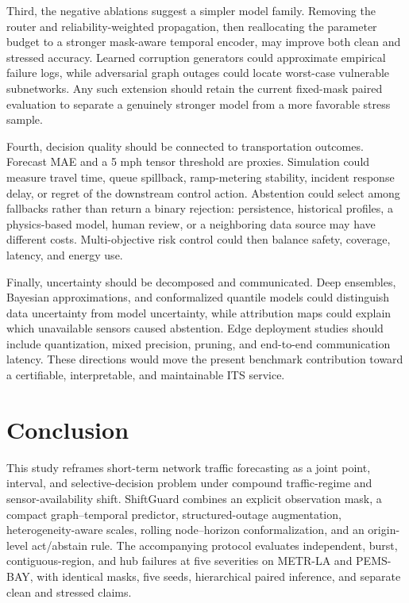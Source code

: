 \documentclass[pdflatex,sn-mathphys-num]{sn-jnl}
\begin{document}
Third, the negative ablations suggest a simpler model family. Removing the
router and reliability-weighted propagation, then reallocating the parameter
budget to a stronger mask-aware temporal encoder, may improve both clean and
stressed accuracy. Learned corruption generators could approximate empirical
failure logs, while adversarial graph outages could locate worst-case vulnerable
subnetworks. Any such extension should retain the current fixed-mask paired
evaluation to separate a genuinely stronger model from a more favorable stress
sample.

Fourth, decision quality should be connected to transportation outcomes.
Forecast MAE and a 5 mph tensor threshold are proxies. Simulation could measure
travel time, queue spillback, ramp-metering stability, incident response delay,
or regret of the downstream control action. Abstention could select among
fallbacks rather than return a binary rejection: persistence, historical
profiles, a physics-based model, human review, or a neighboring data source may
have different costs. Multi-objective risk control could then balance safety,
coverage, latency, and energy use.

Finally, uncertainty should be decomposed and communicated. Deep ensembles,
Bayesian approximations, and conformalized quantile models could distinguish
data uncertainty from model uncertainty, while attribution maps could explain
which unavailable sensors caused abstention. Edge deployment studies should
include quantization, mixed precision, pruning, and end-to-end communication
latency. These directions would move the present benchmark contribution toward
a certifiable, interpretable, and maintainable ITS service.

\section{Conclusion}
This study reframes short-term network traffic forecasting as a joint point,
interval, and selective-decision problem under compound traffic-regime and
sensor-availability shift. ShiftGuard combines an explicit observation mask, a
compact graph--temporal predictor, structured-outage augmentation,
heterogeneity-aware scales, rolling node--horizon conformalization, and an
origin-level act/abstain rule. The accompanying protocol evaluates independent,
burst, contiguous-region, and hub failures at five severities on METR-LA and
PEMS-BAY, with identical masks, five seeds, hierarchical paired inference, and
separate clean and stressed claims.
\end{document}
